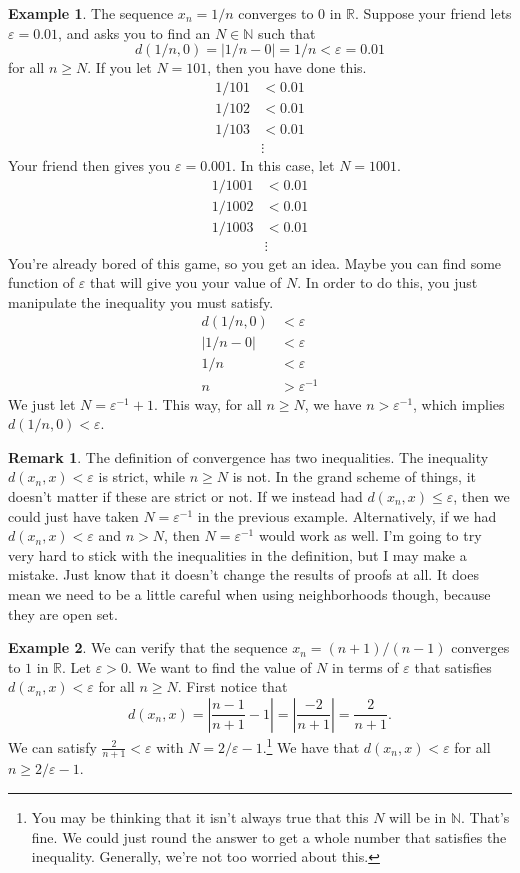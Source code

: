 \documentclass{article}
\newcommand{\N}{\mathbb{N}}
\newcommand{\R}{\mathbb{R}}
\theoremstyle{definition}
\newtheorem{example}{Example}[section]
\newtheorem{remark}{Remark}[section]
\begin{document}
	\begin{example}
		The sequence $ x_n=1/n $ converges to $ 0 $ in $ \R $. Suppose your friend lets $ \varepsilon=0.01 $, and asks you to find an $ N\in\N $ such that $$ d(1/n,0)=|1/n-0|=1/n<\varepsilon=0.01 $$ for all $ n\ge N $. If you let $ N=101 $, then you have done this. \begin{align*}
			1/101&<0.01\\1/102&<0.01\\1/103&<0.01\\&\vdots
		\end{align*} 
		Your friend then gives you $ \varepsilon=0.001 $. In this case, let $ N=1001 $.
		\begin{align*}
			1/1001&<0.01\\1/1002&<0.01\\1/1003&<0.01\\&\vdots
		\end{align*} 
		You're already bored of this game, so you get an idea. Maybe you can find some function of $ \varepsilon $ that will give you your value of $ N $. In order to do this, you just manipulate the inequality you must satisfy.
		\begin{align*}
			d(1/n,0)&<\varepsilon\\|1/n-0|&<\varepsilon\\1/n&<\varepsilon\\n&>\varepsilon^{-1}		
		\end{align*}
		We just let $ N=\varepsilon^{-1}+1 $. This way, for all $ n\ge N $, we have $ n>\varepsilon^{-1} $, which implies $ d(1/n,0)<\varepsilon $. 
	\end{example}
	\begin{remark}
		The definition of convergence has two inequalities. The inequality $ d(x_n,x)<\varepsilon $ is strict, while $ n\ge N $ is not. In the grand scheme of things, it doesn't matter if these are strict or not. If we instead had $ d(x_n,x)\le\varepsilon $, then we could just have taken $ N=\varepsilon^{-1} $ in the previous example. Alternatively, if we had $ d(x_n,x)<\varepsilon $ and $ n>N $, then $ N=\varepsilon^{-1} $ would work as well. I'm going to try very hard to stick with the inequalities in the definition, but I may make a mistake. Just know that it doesn't change the results of proofs at all. It does mean we need to be a little careful when using neighborhoods though, because they are open set.   
	\end{remark}
	\begin{example}
		We can verify that the sequence $ x_n=(n+1)/(n-1) $ converges to $ 1 $ in $ \R $. Let $ \varepsilon>0 $. We want to find the value of $ N $ in terms of $ \varepsilon $ that satisfies $ d(x_n,x)<\varepsilon $ for all $ n\ge N $. First notice that $$d(x_n,x)=\left\lvert\frac{n-1}{n+1}-1\right\rvert=\left\lvert\frac{-2}{n+1}\right\rvert=\frac{2}{n+1} .$$
		We can satisfy $ \frac{2}{n+1}<\varepsilon $ with $ N=2/\varepsilon-1 $.\footnote{You may be thinking that it isn't always true that this $ N $ will be in $ \N $. That's fine. We could just round the answer to get a whole number that satisfies the inequality. Generally, we're not too worried about this.} We have that $ d(x_n,x)<\varepsilon $ for all $ n\ge 2/\varepsilon-1 $. 
	\end{example}
\end{document}
